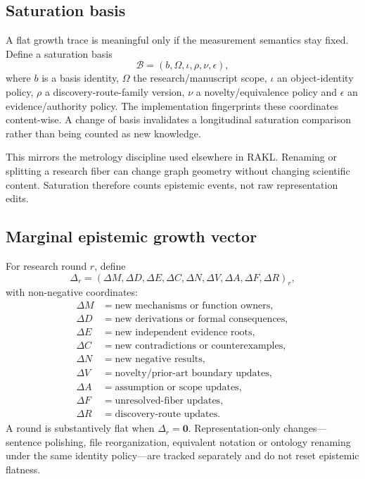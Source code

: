 \documentclass[11pt]{article}
\begin{document}
\subsection{Saturation basis}

A flat growth trace is meaningful only if the measurement semantics stay fixed. Define a saturation basis
\[
\mathcal B=(b,\Omega,\iota,\rho,\nu,\epsilon),
\]
where \(b\) is a basis identity, \(\Omega\) the research/manuscript scope, \(\iota\) an object-identity policy, \(\rho\) a discovery-route-family version, \(\nu\) a novelty/equivalence policy and \(\epsilon\) an evidence/authority policy. The implementation fingerprints these coordinates content-wise. A change of basis invalidates a longitudinal saturation comparison rather than being counted as new knowledge.

This mirrors the metrology discipline used elsewhere in RAKL. Renaming or splitting a research fiber can change graph geometry without changing scientific content. Saturation therefore counts epistemic events, not raw representation edits.

\subsection{Marginal epistemic growth vector}

For research round \(r\), define
\[
\Delta_r=
(\Delta M,\Delta D,\Delta E,\Delta C,\Delta N,
\Delta V,\Delta A,\Delta F,\Delta R)_r,
\]
with non-negative coordinates:
\begin{align*}
\Delta M&=\text{new mechanisms or function owners},\\
\Delta D&=\text{new derivations or formal consequences},\\
\Delta E&=\text{new independent evidence roots},\\
\Delta C&=\text{new contradictions or counterexamples},\\
\Delta N&=\text{new negative results},\\
\Delta V&=\text{novelty/prior-art boundary updates},\\
\Delta A&=\text{assumption or scope updates},\\
\Delta F&=\text{unresolved-fiber updates},\\
\Delta R&=\text{discovery-route updates}.
\end{align*}
A round is substantively flat when \(\Delta_r=\mathbf 0\). Representation-only changes---sentence polishing, file reorganization, equivalent notation or ontology renaming under the same identity policy---are tracked separately and do not reset epistemic flatness.
\end{document}
